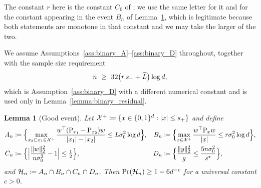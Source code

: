 \documentclass[aos]{imsart}%
\DeclarePairedDelimiter{\norm}{\lVert}{\rVert}
\DeclarePairedDelimiter{\abs}{\lvert}{\rvert}
\newcommand{\ambientspace}[0]{\mathcal{X}}
\renewcommand{\Pr}[0]{\textup{Pr}}
\theoremstyle{plain}
\newtheorem{lemma}[theorem]{Lemma}
\theoremstyle{definition}
\begin{document}
    The constant $r$ here is the constant $C_0$ of
    \citet{YangWainwrightJordan2016}; we use the same letter for it and for
    the constant appearing in the event $B_n$ of
    Lemma~\ref{lemma:binary_good_event}, which is legitimate because both
    statements are monotone in that constant and we may take the larger of the
    two.

    We assume Assumptions~\ref{ass:binary_A}--\ref{ass:binary_D} throughout,
    together with the sample size requirement
    \begin{equation}
        \label{eq:binary_n}
        n\ \geq\ 32\bigl(r\,s_++\widetilde{L}\bigr)\log d ,
    \end{equation}
    which is Assumption~\ref{ass:binary_D} with a different numerical constant
    and is used only in Lemma~\ref{lemma:binary_residual}.

    \begin{lemma}[Good event]
        \label{lemma:binary_good_event}
        Let $\ambientspace^{+}\coloneq\{x\in\{0,1\}^{d}:\abs{x}\leq s_+\}$
        and define
        \begin{align}
            \label{eq:binary_events}
            A_n&\coloneq\Bigl\{\max_{x_2\subset x_1\in\ambientspace^{+}}
            \frac{w^{\top}(\Proj_{x_1}-\Proj_{x_2})w}{\abs{x_1}-\abs{x_2}}
            \leq L\sigma_0^{2}\log d\Bigr\},
            &
            B_n&\coloneq\Bigl\{\max_{x\in\ambientspace^{+}}
            \frac{w^{\top}\Proj_xw}{\abs{x}}\leq r\sigma_0^{2}\log d\Bigr\},
            \\
            \nonumber
            C_n&\coloneq\Bigl\{\Bigl|\frac{\norm{w}_2^{2}}{n\sigma_0^{2}}-1
            \Bigr|\leq\tfrac12\Bigr\},
            &
            D_n&\coloneq\Bigl\{\frac{\norm{y}_2^{2}}{g}\leq
            \frac{5n\sigma_0^{2}}{s^{\star}}\Bigr\},
        \end{align}
        and $\mathcal{H}_n\coloneq A_n\cap B_n\cap C_n\cap D_n$. Then
        $\Pr(\Good)\geq1-6d^{-c}$ for a universal constant $c>0$.
    \end{lemma}
\end{document}
